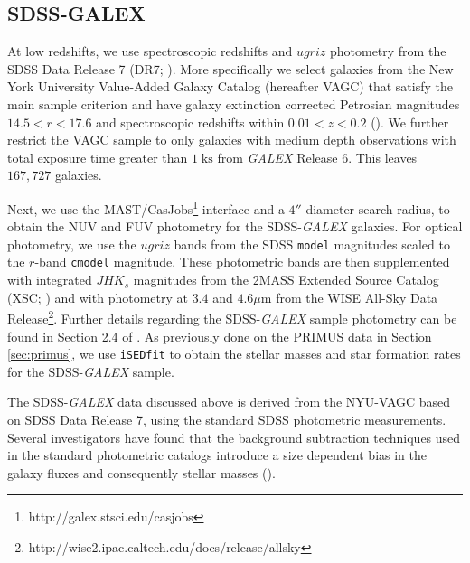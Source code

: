 \subsection{SDSS-GALEX} \label{sec:sdss}
At low redshifts, we use spectroscopic redshifts and $ugriz$ photometry from the SDSS Data Release 7 (DR7; \citealt{Abazajian:2009aa}). More specifically we select galaxies from the New York University Value-Added Galaxy Catalog (hereafter VAGC) that satisfy the main sample criterion and have galaxy extinction corrected Petrosian magnitudes $14.5 < r < 17.6$ and spectroscopic redshifts within $0.01 < z < 0.2$ (\citealt{Blanton:2005aa}). We further restrict the VAGC sample to only galaxies with medium depth observations with total exposure time greater than $1 \; \mathrm{ks}$ from {\em GALEX} Release 6. This leaves $167,727$ galaxies. 

Next, we use the MAST/CasJobs\footnote{http://galex.stsci.edu/casjobs} interface and a $4''$ diameter search radius, to obtain the NUV and FUV photometry for the SDSS-{\em GALEX} galaxies. For optical photometry, we use the $ugriz$ bands from the SDSS \texttt{model} magnitudes scaled to the $r$-band \texttt{cmodel} magnitude. These photometric bands are then supplemented with integrated $JHK_s$ magnitudes from the 2MASS Extended Source Catalog (XSC; \citealt{Jarrett:2000aa}) and with photometry at $3.4$ and $4.6 \mu \mathrm{m}$ from the WISE All-Sky Data Release\footnote{http://wise2.ipac.caltech.edu/docs/release/allsky}. Further details regarding the SDSS-{\em GALEX} sample photometry can be found in Section 2.4 of \cite{Moustakas:2013aa}. As previously done on the PRIMUS data in Section \ref{sec:primus}, we use \texttt{iSEDfit} to obtain the stellar masses and star formation rates for the SDSS-{\em GALEX} sample. 

The SDSS-{\em GALEX} data discussed above is derived from the NYU-VAGC
based on SDSS Data Release 7, using the standard SDSS photometric
measurements. Several investigators have found that the background
subtraction techniques used in the standard photometric catalogs
introduce a size dependent bias in the galaxy fluxes and consequently
stellar masses (\citealt{West:2005aa, Blanton:2005ab, Lauer:2007aa, Bernardi:2007aa,
  Hyde:2009aa, West:2010aa}).

